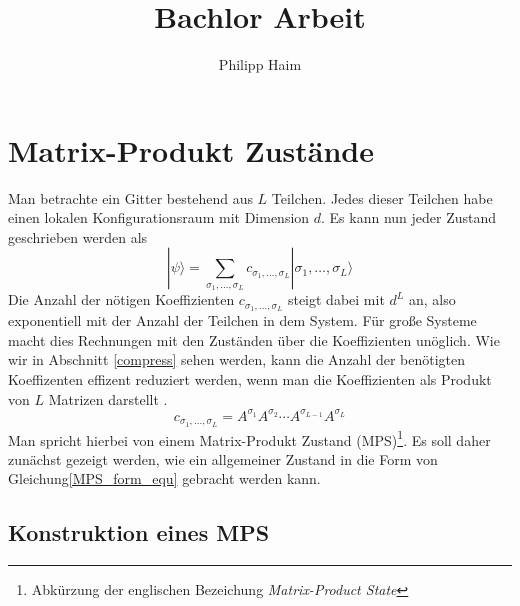 \documentclass[10pt,a4paper]{report}
\author{Philipp Haim}
\title{Bachlor Arbeit}
\newcommand{\SumIndex}{\sigma_1,\ldots,\sigma_L}
\begin{document}
\maketitle
\begin{abstract}

\end{abstract}
\tableofcontents

\chapter{Matrix-Produkt Zustände}\label{MPS_chapter}



Man betrachte ein Gitter bestehend aus $L$ Teilchen. Jedes dieser Teilchen habe einen lokalen Konfigurationsraum mit Dimension $d$. Es kann nun jeder Zustand geschrieben werden als 
\begin{equation}\label{psi_equ}
|\psi\rangle=\sum_{\SumIndex} c_{\SumIndex}|\SumIndex\rangle
\end{equation}
Die Anzahl der nötigen Koeffizienten $c_{\sigma_1,\ldots,\sigma_L}$ steigt dabei mit $d^L$ an, also exponentiell mit der Anzahl der Teilchen in dem System. Für große Systeme macht dies Rechnungen mit den Zuständen über die Koeffizienten unöglich. Wie wir in Abschnitt \ref{compress} sehen werden, kann die Anzahl der benötigten Koeffizenten effizent reduziert werden, wenn man die Koeffizienten als Produkt von $L$ Matrizen darstellt \cite{MPS-main}.
\begin{equation}\label{MPS_form_equ}
c_{\SumIndex}=A^{\sigma_1}A^{\sigma_2}\cdots A^{\sigma_{L-1}}A^{\sigma_L}
\end{equation}
Man spricht hierbei von einem Matrix-Produkt Zustand (MPS)\footnote{Abkürzung der englischen Bezeichung \textit{Matrix-Product State}}.
Es soll daher zunächst gezeigt werden, wie ein allgemeiner Zustand in die Form von Gleichung\ref{MPS_form_equ} gebracht werden kann.
\section{Konstruktion eines MPS}\label{construction}
\end{document}
